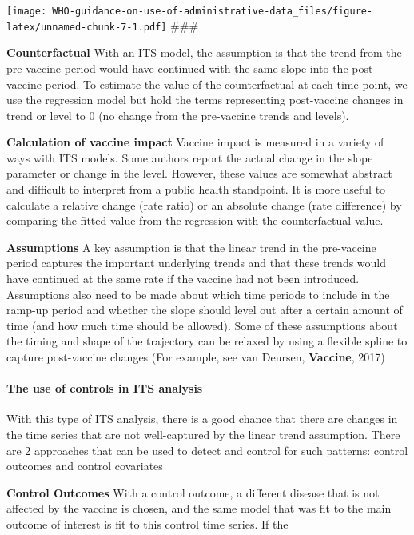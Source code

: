 \documentclass[]{article}
\let\oldparagraph\paragraph
\renewcommand{\paragraph}[1]{\oldparagraph{#1}\mbox{}}
\begin{document}
\texttt{[image: WHO-guidance-on-use-of-administrative-data\_files/figure-latex/unnamed-chunk-7-1.pdf]}
\#\#\#

\textbf{Counterfactual} With an ITS model, the assumption is that the
trend from the pre-vaccine period would have continued with the same
slope into the post-vaccine period. To estimate the value of the
counterfactual at each time point, we use the regression model but hold
the terms representing post-vaccine changes in trend or level to 0 (no
change from the pre-vaccine trends and levels).

\textbf{Calculation of vaccine impact} Vaccine impact is measured in a
variety of ways with ITS models. Some authors report the actual change
in the slope parameter or change in the level. However, these values are
somewhat abstract and difficult to interpret from a public health
standpoint. It is more useful to calculate a relative change (rate
ratio) or an absolute change (rate difference) by comparing the fitted
value from the regression with the counterfactual value.

\textbf{Assumptions} A key assumption is that the linear trend in the
pre-vaccine period captures the important underlying trends and that
these trends would have continued at the same rate if the vaccine had
not been introduced. Assumptions also need to be made about which time
periods to include in the ramp-up period and whether the slope should
level out after a certain amount of time (and how much time should be
allowed). Some of these assumptions about the timing and shape of the
trajectory can be relaxed by using a flexible spline to capture
post-vaccine changes (For example, see van Deursen, \textbf{Vaccine},
2017)

\paragraph{The use of controls in ITS
analysis}\label{the-use-of-controls-in-its-analysis}

With this type of ITS analysis, there is a good chance that there are
changes in the time series that are not well-captured by the linear
trend assumption. There are 2 approaches that can be used to detect and
control for such patterns: control outcomes and control covariates

\textbf{Control Outcomes} With a control outcome, a different disease
that is not affected by the vaccine is chosen, and the same model that
was fit to the main outcome of interest is fit to this control time
series. If the
\end{document}
